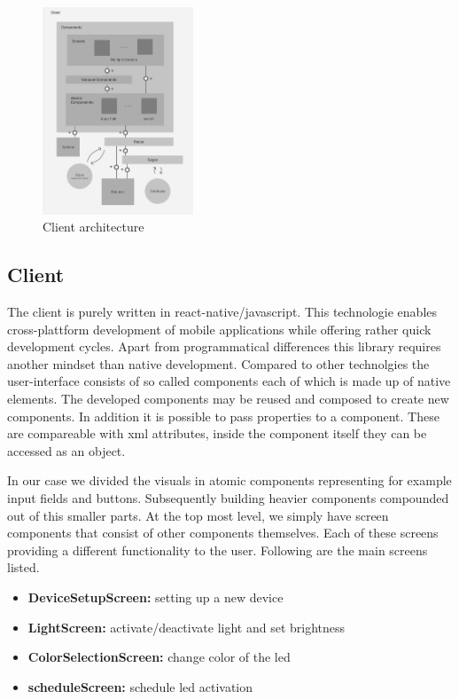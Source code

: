 \documentclass[conference]{IEEEtran}
\begin{document}
\begin{figure}
    \centering
    \includegraphics[width=0.4\textwidth]{client_architecture}
    \caption{Client architecture}
\end{figure}


\subsection{Client}
The client is purely written in react-native/javascript. This technologie enables cross-plattform development of mobile applications while offering
rather quick development cycles. Apart from programmatical differences this library requires another mindset than native development.
Compared to other technolgies the user-interface consists of so called components each of which is made up of native elements. The developed components
may be reused and composed to create new components. In addition it is possible to pass properties to a component. These are compareable with xml
attributes, inside the component itself they can be accessed as an object. 

In our case we divided the visuals in atomic components representing for example input fields and buttons. Subsequently building
heavier components compounded out of this smaller parts. At the top most level, we simply have screen components that consist of other components 
themselves. Each of these screens providing a different functionality to the user. Following are the main screens listed.

\begin{itemize}
    \item \textbf{DeviceSetupScreen:} setting up a new device
    \item \textbf{LightScreen:} activate/deactivate light and set brightness
    \item \textbf{ColorSelectionScreen:} change color of the led
    \item \textbf{scheduleScreen:} schedule led activation 
\end{itemize}
\vspace{5pt}
\end{document}
